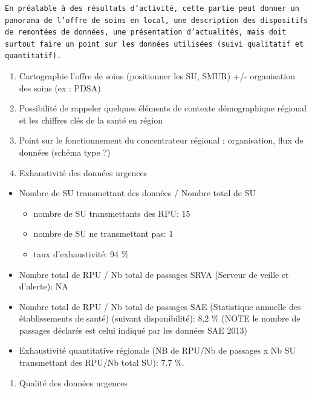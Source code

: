 \documentclass[]{article}
\begin{document}
\begin{verbatim}
En préalable à des résultats d’activité, cette partie peut donner un panorama de l’offre de soins en local, une description des dispositifs de remontées de données, une présentation d’actualités, mais doit surtout faire un point sur les données utilisées (suivi qualitatif et quantitatif).
\end{verbatim}

\begin{enumerate}
\def\labelenumi{\alph{enumi}.}
\item
  Cartographie l'offre de soins (positionner les SU, SMUR) +/-
  organisation des soins (ex : PDSA)
\item
  Possibilité de rappeler quelques éléments de contexte démographique
  régional et les chiffres clés de la santé en région
\item
  Point sur le fonctionnement du concentrateur régional : organisation,
  flux de données (schéma type ?)
\item
  Exhaustivité des données urgences
\end{enumerate}

\begin{itemize}
\item
  Nombre de SU transmettant des données / Nombre total de SU

  \begin{itemize}
  \itemsep1pt\parskip0pt
  \item
    nombre de SU transmettants des RPU: 15
  \item
    nombre de SU ne transmettant pas: 1
  \item
    taux d'exhaustivité: 94 \%
  \end{itemize}
\item
  Nombre total de RPU / Nb total de passages SRVA (Serveur de veille et
  d'alerte): NA
\item
  Nombre total de RPU / Nb total de passages SAE (Statistique annuelle
  des établissements de santé) (suivant disponibilité): 8,2 \% (NOTE le
  nombre de passages déclarés est celui indiqué par les données SAE
  2013)
\item
  Exhaustivité quantitative régionale (NB de RPU/Nb de passages x Nb SU
  transmettant des RPU/Nb total SU): 7.7 \%.
\end{itemize}

\begin{enumerate}
\def\labelenumi{\roman{enumi}.}
\setcounter{enumi}{1}
\itemsep1pt\parskip0pt
\item
  Qualité des données urgences
\end{enumerate}
\end{document}
